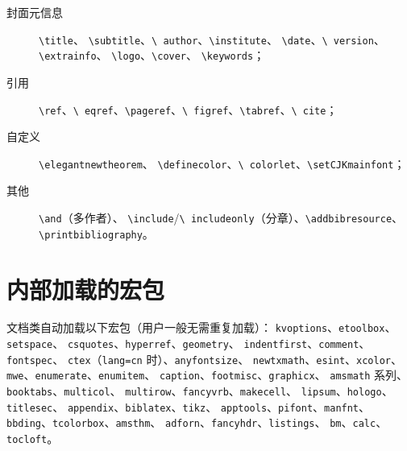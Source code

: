 \begin{description}
  \item[封面元信息] \texttt{\textbackslash title}、
        \texttt{\textbackslash subtitle}、\texttt{\textbackslash
        author}、\texttt{\textbackslash institute}、
        \texttt{\textbackslash date}、\texttt{\textbackslash
        version}、\texttt{\textbackslash extrainfo}、
        \texttt{\textbackslash logo}、\texttt{\textbackslash cover}、
        \texttt{\textbackslash keywords}；
  \item[引用] \texttt{\textbackslash ref}、\texttt{\textbackslash
        eqref}、\texttt{\textbackslash pageref}、\texttt{\textbackslash
        figref}、\texttt{\textbackslash tabref}、\texttt{\textbackslash
        cite}；
  \item[自定义] \texttt{\textbackslash elegantnewtheorem}、
        \texttt{\textbackslash definecolor}、\texttt{\textbackslash
        colorlet}、\texttt{\textbackslash setCJKmainfont}；
  \item[其他] \texttt{\textbackslash and}（多作者）、
        \texttt{\textbackslash include}/\texttt{\textbackslash
        includeonly}（分章）、\texttt{\textbackslash addbibresource}、
        \texttt{\textbackslash printbibliography}。
\end{description}

\section{内部加载的宏包}

文档类自动加载以下宏包（用户一般无需重复加载）：
\texttt{kvoptions}、\texttt{etoolbox}、\texttt{setspace}、
\texttt{csquotes}、\texttt{hyperref}、\texttt{geometry}、
\texttt{indentfirst}、\texttt{comment}、\texttt{fontspec}、
\texttt{ctex}（\texttt{lang=cn} 时）、\texttt{anyfontsize}、
\texttt{newtxmath}、\texttt{esint}、\texttt{xcolor}、
\texttt{mwe}、\texttt{enumerate}、\texttt{enumitem}、
\texttt{caption}、\texttt{footmisc}、\texttt{graphicx}、
\texttt{amsmath} 系列、\texttt{booktabs}、\texttt{multicol}、
\texttt{multirow}、\texttt{fancyvrb}、\texttt{makecell}、
\texttt{lipsum}、\texttt{hologo}、\texttt{titlesec}、
\texttt{appendix}、\texttt{biblatex}、\texttt{tikz}、
\texttt{apptools}、\texttt{pifont}、\texttt{manfnt}、
\texttt{bbding}、\texttt{tcolorbox}、\texttt{amsthm}、
\texttt{adforn}、\texttt{fancyhdr}、\texttt{listings}、
\texttt{bm}、\texttt{calc}、\texttt{tocloft}。
